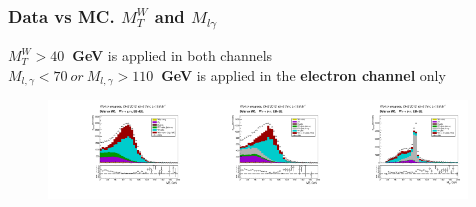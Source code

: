 \begin{frame}\frametitle{Data vs MC. $M_T^W$ and $M_{l\gamma}$}
\scriptsize
{\bfseries{$M_T^W>40$~GeV}} is applied in both channels\\
{\bfseries{$M_{l,\gamma}<70~or~M_{l,\gamma}>110$~GeV}} is applied in the {\bfseries{electron channel}} only
\begin{figure}[htb]
  \begin{center}
   \includegraphics[width=0.33\textwidth]{../figs/figs_v11/MUON_WGamma/PrepareYields/c_TotalDATAvsMC_EtaCommon__WMtVERY_PRELIMINARY.pdf}\includegraphics[width=0.33\textwidth]{../figs/figs_v11/ELECTRON_WGamma/PrepareYields/c_TotalDATAvsMC_EtaCommon__WMtVERY_PRELIMINARY.pdf}\includegraphics[width=0.33\textwidth]{../figs/figs_v11/ELECTRON_WGamma/PrepareYields/c_TotalDATAvsMC_EtaCommon__Mpholep1PRELIMINARY_FOR_E_TO_GAMMA_WITH_PSV_CUT.pdf}
  \end{center}
\end{figure}
\end{frame}

